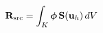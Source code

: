 \documentclass[preview]{standalone}
\begin{document}
\begin{align*}
\special{dvisvgm:raw <g id='unique000'>}\mathbf{R}_{\text{src}} = \int_K \boldsymbol{\phi}\,\mathbf{S}(\mathbf{u}_h)\, dV\special{dvisvgm:raw </g>}
\end{align*}
\end{document}

